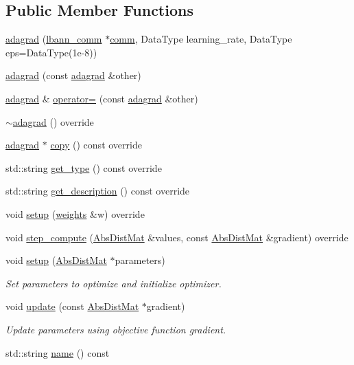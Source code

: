 \subsection*{Public Member Functions}
\begin{DoxyCompactItemize}
\item 
\hyperlink{classlbann_1_1adagrad_a26d826ba89053481a26573a592ff2f8a}{adagrad} (\hyperlink{classlbann_1_1lbann__comm}{lbann\+\_\+comm} $\ast$\hyperlink{file__io_8cpp_ab048c6f9fcbcfaa57ce68b00263dbebe}{comm}, Data\+Type learning\+\_\+rate, Data\+Type eps=Data\+Type(1e-\/8))
\item 
\hyperlink{classlbann_1_1adagrad_aee9814a21ad8c44b402c77f244235597}{adagrad} (const \hyperlink{classlbann_1_1adagrad}{adagrad} \&other)
\item 
\hyperlink{classlbann_1_1adagrad}{adagrad} \& \hyperlink{classlbann_1_1adagrad_a9c9b59e0dfdfa32a3a9596a38fd95af6}{operator=} (const \hyperlink{classlbann_1_1adagrad}{adagrad} \&other)
\item 
\hyperlink{classlbann_1_1adagrad_aa8dcd50b119871cbe1db9817fc00ea52}{$\sim$adagrad} () override
\item 
\hyperlink{classlbann_1_1adagrad}{adagrad} $\ast$ \hyperlink{classlbann_1_1adagrad_a4e8a72adf65df84d15f24fe6be03d1b1}{copy} () const override
\item 
std\+::string \hyperlink{classlbann_1_1adagrad_a7a287b367af6ef6f7f21141ad78732a7}{get\+\_\+type} () const override
\item 
std\+::string \hyperlink{classlbann_1_1adagrad_ad8c3000c84809fab63672e9eb35c5370}{get\+\_\+description} () const override
\item 
void \hyperlink{classlbann_1_1adagrad_ab027f2979a6df453eb588b1961afd77a}{setup} (\hyperlink{classlbann_1_1weights}{weights} \&w) override
\item 
void \hyperlink{classlbann_1_1adagrad_a99dbaed2a331ce8d13a73e7beb7f5aba}{step\+\_\+compute} (\hyperlink{base_8hpp_a9a697a504ae84010e7439ffec862b470}{Abs\+Dist\+Mat} \&values, const \hyperlink{base_8hpp_a9a697a504ae84010e7439ffec862b470}{Abs\+Dist\+Mat} \&gradient) override
\item 
void \hyperlink{classlbann_1_1adagrad_a90644f13d0a46e0f52122037f363aaa0}{setup} (\hyperlink{base_8hpp_a9a697a504ae84010e7439ffec862b470}{Abs\+Dist\+Mat} $\ast$parameters)
\begin{DoxyCompactList}\small\item\em Set parameters to optimize and initialize optimizer. \end{DoxyCompactList}\item 
void \hyperlink{classlbann_1_1adagrad_a2189fad7d43175458d613bd078ff2b78}{update} (const \hyperlink{base_8hpp_a9a697a504ae84010e7439ffec862b470}{Abs\+Dist\+Mat} $\ast$gradient)
\begin{DoxyCompactList}\small\item\em Update parameters using objective function gradient. \end{DoxyCompactList}\item 
std\+::string \hyperlink{classlbann_1_1adagrad_af0fe80dbe6525509aae3ef2dea62a018}{name} () const
\end{DoxyCompactItemize}
